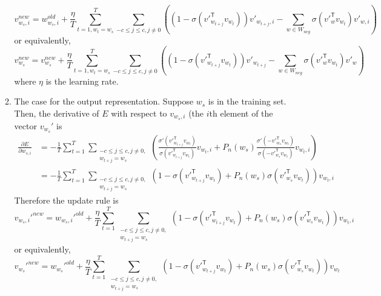 \documentclass[
	12pt, %
]{../Template/fphw}
\newcommand{\T}{\mathsf{T}}
\begin{document}
\begin{enumerate}[label=(\arabic*)]
\begin{enumerate}[label=(\roman*)]
            \begin{equation}
                v_{w_s,i}^{new} = w_{w_s,i}^{old}+\frac{\eta}{T}\sum_{t=1, w_t=w_s}^{T}\sum_{-c\leq j \leq c, j\neq 0} \left( (1-\sigma(v'^\T_{w_{t+j}} v_{w_t}))v'_{w_{t+j},i}-\sum_{w\in W_{neg}}\sigma(v'^\T_{w} v_{w_t})v'_{w,i} \right)
            \end{equation}
            or equivalently,
            \begin{equation}
                v_{w_s}^{new} = v_{w_s}^{new}+\frac{\eta}{T}\sum_{t=1, w_t=w_s}^{T}\sum_{-c\leq j \leq c, j\neq 0} \left( (1-\sigma(v'^\T_{w_{t+j}} v_{w_t}))v'_{w_{t+j}}-\sum_{w\in W_{neg}}\sigma(v'^\T_{w} v_{w_t})v'_{w} \right)
            \end{equation}
            where $\eta$ is the learning rate.
            \item The case for the output representation. Suppose $w_s$ is in the training set. Then, the derivative of $E$ with respect to $v_{w_s,i}$ (the $i$th element of the vector $v_{w_s}'$ is
            \begin{align}
                \frac{\partial E}{\partial w_{s,i}} &= -\frac{1}{T}\sum_{t=1}^{T}\sum_{\substack{-c\leq j \leq c, j\neq 0, \\ w_{t+j}=w_s}} \left( \frac{\sigma'(v'^\T_{w_{t+j}} v_{w_t})}{\sigma(v'^\T_{w_{t+j}}v_{w_t})} v_{w_t,i}+P_n(w_{s}) \frac{\sigma'(-v'^\T_{w_{s}} v_{w_t})}{\sigma(-v'^\T_{w_{s}}v_{w_t})}v_{w_t,i}\right) \\
                &= -\frac{1}{T}\sum_{t=1}^{T}\sum_{\substack{-c\leq j \leq c, j\neq 0, \\ w_{t+j}=w_s}} \left(1-\sigma(v'^\T_{w_{t+j}} v_{w_t}) + P_n(w_s)\sigma(v'^\T_{w_s} v_{w_t})  \right)v_{w_t,i}
            \end{align}
            Therefore the update rule is
            \begin{equation}
                v_{w_s,i}'^{new} = w_{w_s,i}'^{old}+ \frac{\eta}{T}\sum_{t=1}^{T}\sum_{\substack{-c\leq j \leq c, j\neq 0, \\ w_{t+j}=w_s}} \left(1-\sigma(v'^\T_{w_{t+j}} v_{w_t}) + P_n(w_s)\sigma(v'^\T_{w_s} v_{w_t})  \right)v_{w_t,i}
            \end{equation}
            or equivalently,
            \begin{equation}
                v_{w_s}'^{new} = w_{w_s}'^{old}+ \frac{\eta}{T}\sum_{t=1}^{T}\sum_{\substack{-c\leq j \leq c, j\neq 0, \\ w_{t+j}=w_s}} \left(1-\sigma(v'^\T_{w_{t+j}} v_{w_t}) + P_n(w_s)\sigma(v'^\T_{w_s} v_{w_t})  \right)v_{w_t}
            \end{equation}
        \end{enumerate}


\end{enumerate}
\end{document}
